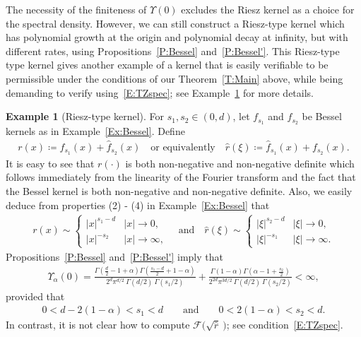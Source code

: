 \documentclass[a4paper,11pt]{article}%
\theoremstyle{plain}
\theoremstyle{definition}
\newtheorem{example}[theorem]{Example}
\numberwithin{equation}{section}
\begin{document}
The necessity of the finiteness of $\Upsilon(0)$ excludes the Riesz kernel as a choice for the
spectral density. However, we can still construct a Riesz-type kernel which has polynomial growth at
the origin and polynomial decay at infinity, but with different rates, using
Propositions~\ref{P:Bessel} and~\ref{P:Bessel'}. This Riesz-type type kernel gives another example
of a kernel that is easily verifiable to be permissible under the conditions of our
Theorem~\ref{T:Main} above, while being demanding to verify using~\eqref{E:TZspec}; see
Example~\ref{Ex:Riesz-T} for more details.

\begin{example}[Riesz-type kernel]\label{Ex:Riesz-T}
  For $s_1, s_2\in (0,d)$, let $f_{s_1}$ and $f_{s_2}$ be Bessel kernels as in
  Example~\ref{Ex:Bessel}. Define
  \begin{align*}
    r(x)\coloneqq f_{s_1}(x) + \widehat{f}_{s_2}(x) \quad \text{or equivalently} \quad
    \widehat{r}(\xi)\coloneqq \widehat{f}_{s_1}(x) + f_{s_2}(x).
  \end{align*}
  It is easy to see that $r(\cdot)$ is both non-negative and non-negative definite which follows
  immediately from the linearity of the Fourier transform and the fact that the Bessel kernel is
  both non-negative and non-negative definite. Also, we easily deduce from properties (2) - (4) in
  Example~\ref{Ex:Bessel} that
  \begin{align*}
    r(x) \sim
    \begin{cases}
      |x|^{s_1-d} & |x| \to 0, \\
      |x|^{-s_2} & |x| \to \infty,
    \end{cases}
    \quad \text{and} \quad
    \widehat{r}(\xi) \sim
    \begin{cases}
      |\xi|^{s_2 - d} & |\xi| \to 0, \\
      |\xi|^{-s_1}    & |\xi| \to \infty.
    \end{cases}
  \end{align*}
  Propositions~\ref{P:Bessel} and~\ref{P:Bessel'} imply that
  \begin{align*}
    \Upsilon_{\alpha}(0) =
    \frac{\Gamma\left(\frac{d}{2} -1 + \alpha\right) \Gamma\left(\frac{s_1 -d}{2} + 1 - \alpha\right)}{2^d \pi^{d/2} \: \Gamma(d/2)\:\Gamma\left(s_1/2\right)}
    + \frac{\Gamma\left(1 - \alpha\right) \Gamma\left(\alpha - 1 + \frac{s_2}{2}\right)}{2^{2d} \pi^{3d/2} \: \Gamma(d/2) \: \Gamma\left(s_2 / 2\right)} < \infty,
  \end{align*}
  provided that
	\begin{align*}\label{E:RieszTypeCond}
    0 < d - 2(1-\alpha) < s_1 < d  \qquad \text{and} \qquad
    0 < 2(1-\alpha) < s_2 < d.
	\end{align*}
  In contrast, it is not clear how to compute $\mathcal{F}\big(\sqrt{\widehat{r}}\:\big)$; see
  condition~\eqref{E:TZspec}.
\end{example}
\end{document}

